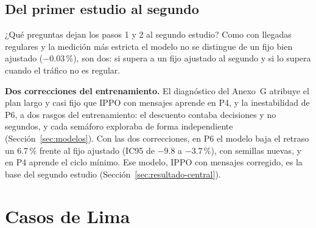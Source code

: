\subsection{Del primer estudio al segundo}
\label{sec:entre-estudios}

¿Qué preguntas dejan los pasos 1 y 2 al segundo estudio? Como con
llegadas regulares y la medición más estricta el modelo no se distingue
de un fijo bien ajustado ($-0.03$\,\%), son dos: si supera a un fijo
ajustado al segundo y si lo supera cuando el tráfico no es regular.

\noindent\textbf{Dos correcciones del entrenamiento.} El diagnóstico
del Anexo~G atribuye el plan largo y casi fijo que IPPO con mensajes
aprende en P4, y la
inestabilidad de P6, a dos rasgos del entrenamiento: el descuento
contaba decisiones y no segundos, y cada semáforo exploraba de forma
independiente (Sección~\ref{sec:modelos}). Con las dos correcciones, en
P6 el modelo baja el retraso un 6.7\,\% frente al fijo ajustado (IC95
de $-9.8$ a $-3.7$\,\%), con semillas nuevas, y en P4 aprende el ciclo
mínimo. Ese modelo, IPPO con mensajes corregido, es la base del segundo
estudio (Sección~\ref{sec:resultado-central}).

\section{Casos de Lima}
\label{sec:caso-lima}
\suppressfloats[t]

